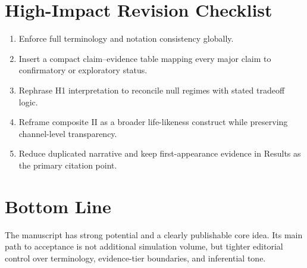 \documentclass[11pt]{article}
\begin{document}
\section*{High-Impact Revision Checklist}
\begin{enumerate}[leftmargin=1.5em]
  \item Enforce full terminology and notation consistency globally.
  \item Insert a compact claim--evidence table mapping every major claim to confirmatory or exploratory status.
  \item Rephrase H1 interpretation to reconcile null regimes with stated tradeoff logic.
  \item Reframe composite II as a broader life-likeness construct while preserving channel-level transparency.
  \item Reduce duplicated narrative and keep first-appearance evidence in Results as the primary citation point.
\end{enumerate}

\section*{Bottom Line}
The manuscript has strong potential and a clearly publishable core idea. Its main path to acceptance is not additional simulation volume, but tighter editorial control over terminology, evidence-tier boundaries, and inferential tone.
\end{document}
